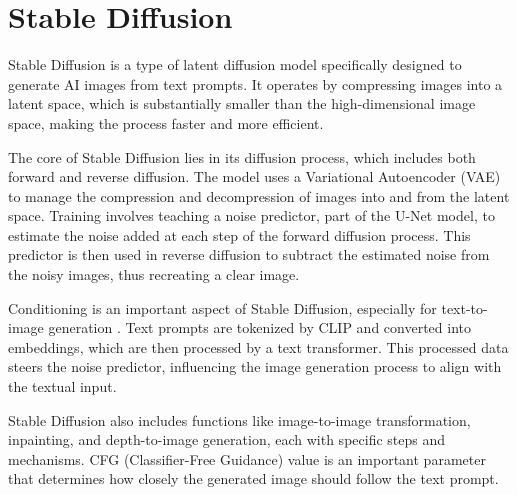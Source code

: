 \section{Stable Diffusion}\label{stableDiffusion}

Stable Diffusion \citep{rombachStableDiffusion} is a type of latent diffusion model specifically designed to generate AI images from text prompts. It operates by compressing images into a latent space, which is substantially smaller than the high-dimensional image space, making the process faster and more efficient.

The core of Stable Diffusion lies in its diffusion process, which includes both forward and reverse diffusion. The model uses a Variational Autoencoder (VAE) to manage the compression and decompression of images into and from the latent space. Training involves teaching a noise predictor, part of the U-Net model, to estimate the noise added at each step of the forward diffusion process. This predictor is then used in reverse diffusion to subtract the estimated noise from the noisy images, thus recreating a clear image.

Conditioning is an important aspect of Stable Diffusion, especially for text-to-image generation \citep{rombachStableDiffusion}. Text prompts are tokenized by CLIP and converted into embeddings, which are then processed by a text transformer. This processed data steers the noise predictor, influencing the image generation process to align with the textual input.

Stable Diffusion also includes functions like image-to-image transformation, inpainting, and depth-to-image generation, each with specific steps and mechanisms. CFG (Classifier-Free Guidance) value \citep{ho2022classifier} is an important parameter that determines how closely the generated image should follow the text prompt.